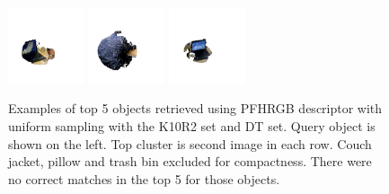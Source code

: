 \documentclass[11pt,a4paper]{kth-mag}
\begin{document}
\begin{figure}
{{      \includegraphics[width=0.2\textwidth]{images/queryresults/laptop_2}
      \includegraphics[width=0.2\textwidth]{images/queryresults/laptop_3}
      \includegraphics[width=0.2\textwidth]{images/queryresults/laptop_4}
    }\\
  }
  \caption{Examples of top 5 objects retrieved using PFHRGB descriptor with uniform
    sampling with the K10R2 set and DT set. Query object is shown on the left.
    Top cluster is second image in each row. Couch jacket, pillow and trash bin
    excluded for compactness. There were no correct matches in the top 5 for
    those objects.}
  \label{fig:retrieval}
\end{figure}
\end{document}
